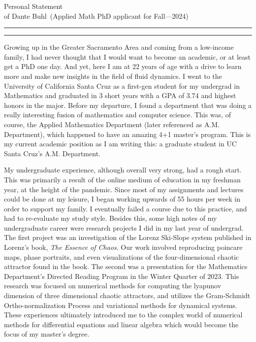 \documentclass{article}
\newcommand{\soptitle}{Personal Statement}
\newcommand{\yourname}{Dante Buhl}
\begin{document}
\begin{center}\LARGE\soptitle\\
\large of \yourname\ (Applied Math PhD applicant for Fall---2024)
\end{center}

\hrule
\vspace{1pt}
\hrule height 1pt

\bigskip

\large
Growing up in the Greater Sacramento Area and coming from a low-income family, I had never thought that I would want to become an academic, or at least get a PhD one day. And yet, here I am at 22 years of age with a drive to learn more and make new insights in the field of fluid dynamics. I went to the University of California Santa Cruz as a first-gen student for my undergrad in Mathematics and graduated in 3 short years with a GPA of 3.74 and highest honors in the major. Before my departure, I found a department that was doing a really interesting fusion of mathematics and computer science. This was, of course, the Applied Mathematics Department (later referenced as A.M. Department), which happened to have an amazing 4+1 master's program. This is my current academic position as I am writing this: a graduate student in UC Santa Cruz's A.M. Department. 

My undergraduate experience, although overall very strong, had a rough start. This was primarily a result of the online medium of education in my freshman year, at the height of the pandemic. Since most of my assignments and lectures could be done at my leisure, I began working upwards of 55 hours per week in order to support my family. I eventually failed a course due to this practice, and had to re-evaluate my study style. Besides this, some high notes of my undergraduate career were research projects I did in my last year of undergrad. The first project was an investigation of the Lorenz Ski-Slope system published in Lorenz's book, \textit{The Essence of Chaos}. Our work involved reproducing poincare maps, phase portraits, and even visualizations of the four-dimensional chaotic attractor found in the book. The second was a presentation for the Mathematics Department's Directed Reading Program in the Winter Quarter of 2023. This research was focused on numerical methods for computing the lyapunov dimension of three dimensional chaotic attractors, and utilizes the Gram-Schmidt Ortho-normalization Process and variational methods for dynamical systems. These experiences ultimately introduced me to the complex world of numerical methods for differential equations and linear algebra which would become the focus of my master's degree. 
\end{document}
